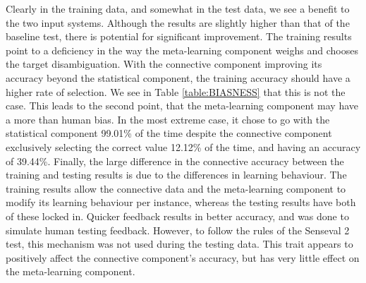 Clearly in the training data, and somewhat in the test data, we see a benefit to
the two input systems. Although the results are slightly higher than that of the
baseline test, there is potential for significant improvement.  The training
results point to a deficiency in the way the meta-learning component weighs and
chooses the target disambiguation.  With the connective component improving its
accuracy beyond the statistical component, the training accuracy should have a
higher rate of selection. We see in Table \ref{table:BIASNESS} that this is not
the case. This leads to the second point, that the meta-learning component may have a
more than human bias.  In the most extreme case, it chose to go with the
statistical component 99.01\% of the time despite the connective component
exclusively selecting the correct value 12.12\% of the time, and having an
accuracy of 39.44\%. Finally, the large difference in the connective accuracy
between the training and testing results is due to the differences in learning
behaviour.  The training results allow the connective data and the meta-learning
component to modify its learning behaviour per instance, whereas the testing
results have both of these locked in.  Quicker feedback results in better
accuracy, and was done to simulate human testing feedback. However, to follow
the rules of the Senseval 2 test, this mechanism was not used during the testing
data.  This trait appears to positively affect the connective component's
accuracy, but has very little effect on the meta-learning component.

